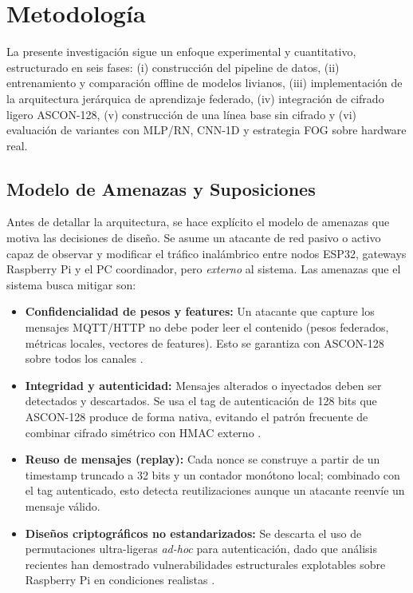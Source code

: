 \chapter{Metodología}
\label{chap:meth}

La presente investigación sigue un enfoque experimental y cuantitativo, estructurado en seis fases: (i) construcción del pipeline de datos, (ii) entrenamiento y comparación offline de modelos livianos, (iii) implementación de la arquitectura jerárquica de aprendizaje federado, (iv) integración de cifrado ligero ASCON-128, (v) construcción de una línea base sin cifrado y (vi) evaluación de variantes con MLP/RN, CNN-1D y estrategia FOG sobre hardware real.

\section{Modelo de Amenazas y Suposiciones}
\label{sec:threat_model}

Antes de detallar la arquitectura, se hace explícito el modelo de amenazas que motiva las decisiones de diseño. Se asume un atacante de red pasivo o activo capaz de observar y modificar el tráfico inalámbrico entre nodos ESP32, gateways Raspberry Pi y el PC coordinador, pero \emph{externo} al sistema. Las amenazas que el sistema busca mitigar son:

\begin{itemize}[noitemsep, topsep=0pt]
    \item \textbf{Confidencialidad de pesos y features:} Un atacante que capture los mensajes MQTT/HTTP no debe poder leer el contenido (pesos federados, métricas locales, vectores de features). Esto se garantiza con ASCON-128 sobre todos los canales \cite{NISTSP8002322025, Kaur2025_ASCON_Survey}.
    \item \textbf{Integridad y autenticidad:} Mensajes alterados o inyectados deben ser detectados y descartados. Se usa el tag de autenticación de 128 bits que ASCON-128 produce de forma nativa, evitando el patrón frecuente de combinar cifrado simétrico con HMAC externo \cite{NISTIR8454_2023}.
    \item \textbf{Reuso de mensajes (replay):} Cada nonce se construye a partir de un timestamp truncado a 32 bits y un contador monótono local; combinado con el tag autenticado, esto detecta reutilizaciones aunque un atacante reenvíe un mensaje válido.
    \item \textbf{Diseños criptográficos no estandarizados:} Se descarta el uso de permutaciones ultra-ligeras \emph{ad-hoc} para autenticación, dado que análisis recientes han demostrado vulnerabilidades estructurales explotables sobre Raspberry Pi en condiciones realistas \cite{Mirzaali2025_LWC_Permutations}.
\end{itemize}

